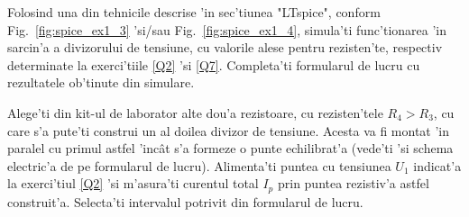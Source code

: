 %
%
\begin{exercise}  \label{Q8}
Folosind una din tehnicile descrise 'in sec'tiunea  "LTspice", conform Fig.~\ref{fig:spice_ex1_3} 'si/sau Fig.~\ref{fig:spice_ex1_4}, simula'ti func'tionarea 'in sarcin'a a divizorului de tensiune, cu valorile alese pentru rezisten'te, respectiv determinate la exerci'tiile \ref{Q2} 'si \ref{Q7}. Completa'ti formularul de lucru cu rezultatele ob'tinute din simulare.
\end{exercise}
%
%
\begin{exercise}  \label{Q9}
Alege'ti din kit-ul de laborator alte dou'a rezistoare, cu rezisten'tele $R_4 > R_3$, cu care s'a pute'ti construi un al doilea divizor de tensiune. Acesta va fi montat 'in paralel cu primul astfel 'inc\^at s'a formeze o punte echilibrat'a (vede'ti 'si schema electric'a de pe formularul de lucru).  
Alimenta'ti puntea cu tensiunea $U_1$ indicat'a la exerci'tiul \ref{Q2} 'si m'asura'ti curentul total $I_p$ prin puntea rezistiv'a astfel construit'a. Selecta'ti intervalul potrivit din formularul de lucru. 
\end{exercise}

